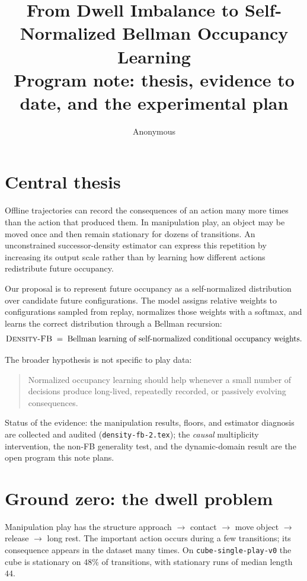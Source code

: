 \documentclass{article}
\title{From Dwell Imbalance to Self-Normalized Bellman Occupancy Learning\\
\large Program note: thesis, evidence to date, and the experimental plan}
\author{Anonymous}
\newcommand{\DensityFB}{\textsc{Density-FB}}
\begin{document}
\maketitle

\section{Central thesis}
\label{sec:thesis}

Offline trajectories can record the consequences of an action many more times than the action that produced them.
In manipulation play, an object may be moved once and then remain stationary for dozens of transitions.
An unconstrained successor-density estimator can express this repetition by increasing its output scale rather than by learning how different actions redistribute future occupancy.

Our proposal is to represent future occupancy as a self-normalized distribution over candidate future configurations.
The model assigns relative weights to configurations sampled from replay, normalizes those weights with a softmax, and learns the correct distribution through a Bellman recursion:
\begin{equation}
\DensityFB{} \;=\; \text{Bellman learning of self-normalized conditional occupancy weights}.
\end{equation}

The broader hypothesis is not specific to play data:
\begin{quote}
Normalized occupancy learning should help whenever a small number of decisions produce long-lived, repeatedly recorded, or passively evolving consequences.
\end{quote}

Status of the evidence: the manipulation results, floors, and estimator diagnosis are collected and audited (\texttt{density-fb-2.tex}); the \emph{causal} multiplicity intervention, the non-FB generality test, and the dynamic-domain result are the open program this note plans.

\section{Ground zero: the dwell problem}
\label{sec:dwell}

Manipulation play has the structure approach $\rightarrow$ contact $\rightarrow$ move object $\rightarrow$ release $\rightarrow$ long rest.
The important action occurs during a few transitions; its consequence appears in the dataset many times.
On \texttt{cube-single-play-v0} the cube is stationary on $48\%$ of transitions, with stationary runs of median length $44$.
\end{document}
